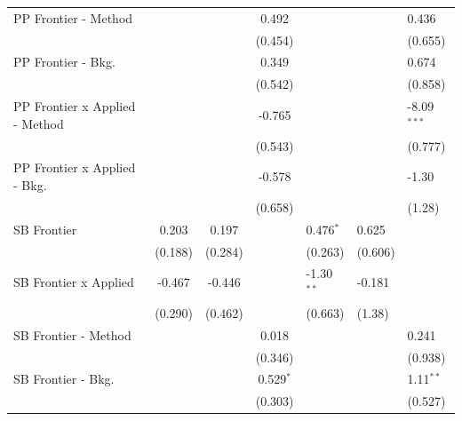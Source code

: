 \begin{tabular}{lccc}
   PP Frontier - Method           &              &               & 0.492         &              &               & 0.436\\   
                                  &              &               & (0.454)       &              &               & (0.655)\\   
   PP Frontier - Bkg.             &              &               & 0.349         &              &               & 0.674\\   
                                  &              &               & (0.542)       &              &               & (0.858)\\   
   PP Frontier x Applied - Method &              &               & -0.765        &              &               & -8.09$^{***}$\\   
                                  &              &               & (0.543)       &              &               & (0.777)\\   
   PP Frontier x Applied - Bkg.   &              &               & -0.578        &              &               & -1.30\\   
                                  &              &               & (0.658)       &              &               & (1.28)\\   
   SB Frontier                    & 0.203        & 0.197         &               & 0.476$^{*}$  & 0.625         &   \\   
                                  & (0.188)      & (0.284)       &               & (0.263)      & (0.606)       &   \\   
   SB Frontier x Applied          & -0.467       & -0.446        &               & -1.30$^{**}$ & -0.181        &   \\   
                                  & (0.290)      & (0.462)       &               & (0.663)      & (1.38)        &   \\   
   SB Frontier - Method           &              &               & 0.018         &              &               & 0.241\\   
                                  &              &               & (0.346)       &              &               & (0.938)\\   
   SB Frontier - Bkg.             &              &               & 0.529$^{*}$   &              &               & 1.11$^{**}$\\   
                                  &              &               & (0.303)       &              &               & (0.527)\\   

\end{tabular}
